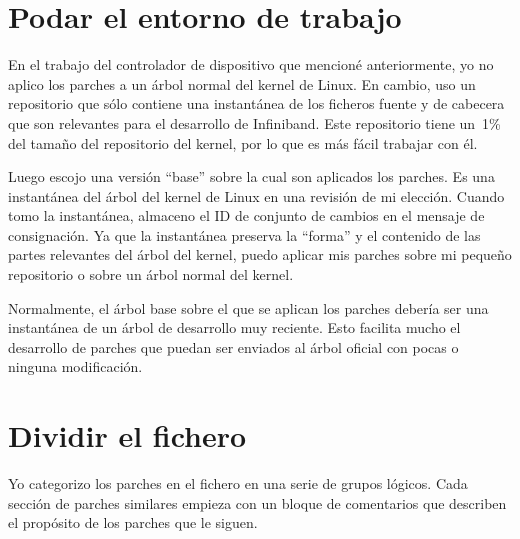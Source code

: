 \section{Podar el entorno de trabajo}

En el trabajo del controlador de dispositivo que mencioné
anteriormente, yo no aplico los parches a un árbol normal del kernel
de Linux. En cambio, uso un repositorio que sólo contiene una
instantánea de los ficheros fuente y de cabecera que son relevantes
para el desarrollo de Infiniband. Este repositorio tiene un~1\% del
tamaño del repositorio del kernel, por lo que es más fácil trabajar
con él.

Luego escojo una versión ``base'' sobre la cual son aplicados los
parches. Es una instantánea del árbol del kernel de Linux en una
revisión de mi elección. Cuando tomo la instantánea, almaceno el ID de
conjunto de cambios en el mensaje de consignación. Ya que la
instantánea preserva la ``forma'' y el contenido de las partes
relevantes del árbol del kernel, puedo aplicar mis parches sobre mi
pequeño repositorio o sobre un árbol normal del kernel.

Normalmente, el árbol base sobre el que se aplican los parches debería
ser una instantánea de un árbol de desarrollo muy reciente. Esto
facilita mucho el desarrollo de parches que puedan ser enviados al
árbol oficial con pocas o ninguna modificación.

\section{Dividir el fichero }

Yo categorizo los parches en el fichero  en una
serie de grupos lógicos. Cada sección de parches similares empieza con
un bloque de comentarios que describen el propósito de los parches que
le siguen.

